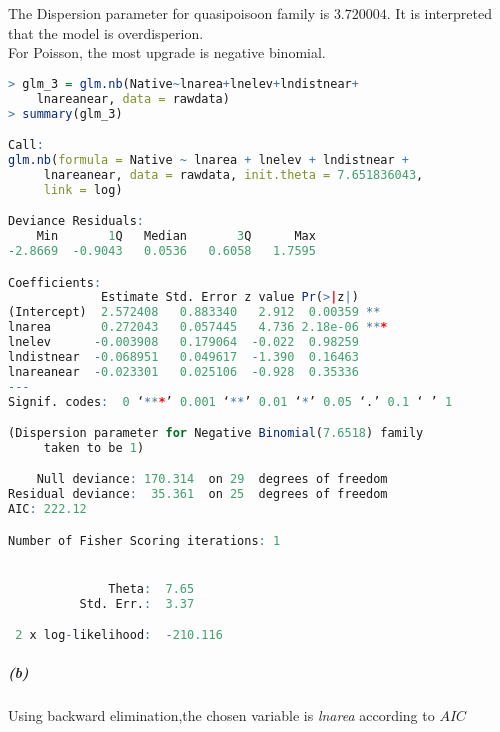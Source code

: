 \documentclass[12pt,a4paper]{article}
\begin{document}
The Dispersion parameter for quasipoisoon family is $3.720004$. It is interpreted that the model is overdisperion.\\
\newline
For Poisson, the most upgrade is negative binomial.
\begin{lstlisting}[language = R]
> glm_3 = glm.nb(Native~lnarea+lnelev+lndistnear+
    lnareanear, data = rawdata) 
> summary(glm_3)

Call:
glm.nb(formula = Native ~ lnarea + lnelev + lndistnear +
     lnareanear, data = rawdata, init.theta = 7.651836043,
     link = log)

Deviance Residuals: 
    Min       1Q   Median       3Q      Max  
-2.8669  -0.9043   0.0536   0.6058   1.7595  

Coefficients:
             Estimate Std. Error z value Pr(>|z|)    
(Intercept)  2.572408   0.883340   2.912  0.00359 ** 
lnarea       0.272043   0.057445   4.736 2.18e-06 ***
lnelev      -0.003908   0.179064  -0.022  0.98259    
lndistnear  -0.068951   0.049617  -1.390  0.16463    
lnareanear  -0.023301   0.025106  -0.928  0.35336    
---
Signif. codes:  0 ‘***’ 0.001 ‘**’ 0.01 ‘*’ 0.05 ‘.’ 0.1 ‘ ’ 1

(Dispersion parameter for Negative Binomial(7.6518) family
     taken to be 1)

    Null deviance: 170.314  on 29  degrees of freedom
Residual deviance:  35.361  on 25  degrees of freedom
AIC: 222.12

Number of Fisher Scoring iterations: 1


              Theta:  7.65 
          Std. Err.:  3.37 

 2 x log-likelihood:  -210.116 
\end{lstlisting}
\subparagraph{(b)}
Using backward elimination,the chosen variable is \emph{lnarea} according to $AIC$
\end{document}
